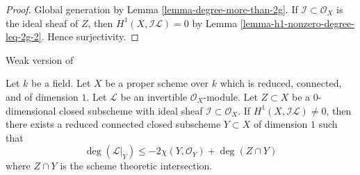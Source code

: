 \begin{proof}
Global generation by Lemma \ref{lemma-degree-more-than-2g}.
If $\mathcal{I} \subset \mathcal{O}_X$ is the ideal sheaf
of $Z$, then $H^1(X, \mathcal{I}\mathcal{L}) = 0$ by
Lemma \ref{lemma-h1-nonzero-degree-leq-2g-2}. Hence surjectivity.
\end{proof}

\begin{lemma}
\label{lemma-vanishing-on-gorenstein}
\begin{reference}
Weak version of \cite[Lemma 4]{Jongmin}
\end{reference}
Let $k$ be a field. Let $X$ be a proper scheme over $k$
which is reduced, connected, and of dimension $1$.
Let $\mathcal{L}$ be an invertible $\mathcal{O}_X$-module.
Let $Z \subset X$ be a $0$-dimensional closed subscheme with ideal
sheaf $\mathcal{I} \subset \mathcal{O}_X$.
If $H^1(X, \mathcal{I}\mathcal{L}) \not = 0$, then there exists
a reduced connected closed subscheme $Y \subset X$
of dimension $1$ such that
$$
\deg(\mathcal{L}|_Y) \leq -2\chi(Y, \mathcal{O}_Y) + \deg(Z \cap Y)
$$
where $Z \cap Y$ is the scheme theoretic intersection.
\end{lemma}

